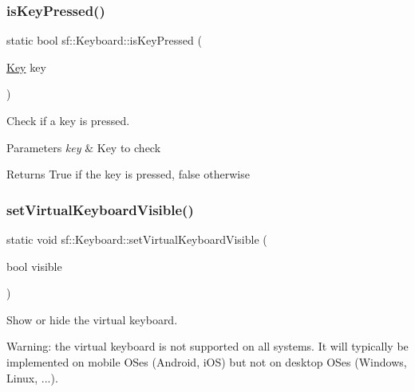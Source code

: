 \subsubsection{\texorpdfstring{isKeyPressed()}{isKeyPressed()}}
{\footnotesize\ttfamily static bool sf\+::\+Keyboard\+::is\+Key\+Pressed (\begin{DoxyParamCaption}\item[{\mbox{\hyperlink{classsf_1_1_keyboard_acb4cacd7cc5802dec45724cf3314a142}{Key}}}]{key }\end{DoxyParamCaption})\hspace{0.3cm}{\ttfamily [static]}}



Check if a key is pressed. 


\begin{DoxyParams}{Parameters}
{\em key} & Key to check\\
\hline
\end{DoxyParams}
\begin{DoxyReturn}{Returns}
True if the key is pressed, false otherwise \begin{DoxyVerb}\end{DoxyVerb}
 
\end{DoxyReturn}
\mbox{\label{classsf_1_1_keyboard_ad61fee7e793242d444a8c5acd662fe5b}} 
\subsubsection{\texorpdfstring{setVirtualKeyboardVisible()}{setVirtualKeyboardVisible()}}
{\footnotesize\ttfamily static void sf\+::\+Keyboard\+::set\+Virtual\+Keyboard\+Visible (\begin{DoxyParamCaption}\item[{bool}]{visible }\end{DoxyParamCaption})\hspace{0.3cm}{\ttfamily [static]}}



Show or hide the virtual keyboard. 

Warning\+: the virtual keyboard is not supported on all systems. It will typically be implemented on mobile O\+Ses (Android, i\+OS) but not on desktop O\+Ses (Windows, Linux, ...).

